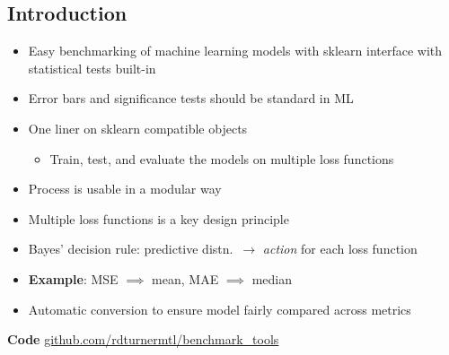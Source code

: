 \documentclass[a0,landscape]{a0poster}
\newcommand{\mysection}[1]{\section*{\fontsize{67.1}{82} \selectfont \color{NavyBlue} #1 \color{Black}}}
\begin{document}
\begin{multicols}{3} %


\Large

\mysection{Introduction}

\begin{itemize}
  \item Easy benchmarking of machine learning models with sklearn interface with statistical tests built-in
  \item Error bars and significance tests should be standard in ML
  \item One liner on sklearn compatible objects
  \begin{itemize}
    \item Train, test, and evaluate the models on multiple loss functions
  \end{itemize}
  \item Process is usable in a modular way
\end{itemize}

\begin{itemize}
  \item Multiple loss functions is a key design principle
  \item Bayes' decision rule: predictive distn.~$\rightarrow$ \emph{action} for each loss function
  \item \textbf{Example}: MSE $\implies$ mean, MAE $\implies$ median
  \item Automatic conversion to ensure model fairly compared across metrics
\end{itemize}
\vspace{17mm}
\textbf{Code}
\large {\url{github.com/rdturnermtl/benchmark_tools}}
\vspace{7mm}

\columnbreak


\end{multicols}
\end{document}
